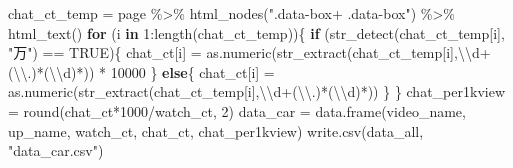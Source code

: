 \documentclass[
]{article}
\newenvironment{Shaded}{\begin{snugshade}}{\end{snugshade}}
\newcommand{\ConstantTok}[1]{\textcolor[rgb]{0.00,0.00,0.00}{#1}}
\newcommand{\ControlFlowTok}[1]{\textcolor[rgb]{0.13,0.29,0.53}{\textbf{#1}}}
\newcommand{\DecValTok}[1]{\textcolor[rgb]{0.00,0.00,0.81}{#1}}
\newcommand{\FunctionTok}[1]{\textcolor[rgb]{0.00,0.00,0.00}{#1}}
\newcommand{\NormalTok}[1]{#1}
\newcommand{\OtherTok}[1]{\textcolor[rgb]{0.56,0.35,0.01}{#1}}
\newcommand{\SpecialCharTok}[1]{\textcolor[rgb]{0.00,0.00,0.00}{#1}}
\newcommand{\StringTok}[1]{\textcolor[rgb]{0.31,0.60,0.02}{#1}}
\begin{document}
\begin{Shaded}
\begin{Highlighting}[]
\NormalTok{chat\_ct\_temp }\OtherTok{=}\NormalTok{ page }\SpecialCharTok{\%\textgreater{}\%} \FunctionTok{html\_nodes}\NormalTok{(}\StringTok{".data{-}box+ .data{-}box"}\NormalTok{) }\SpecialCharTok{\%\textgreater{}\%} \FunctionTok{html\_text}\NormalTok{()}
\ControlFlowTok{for}\NormalTok{ (i }\ControlFlowTok{in} \DecValTok{1}\SpecialCharTok{:}\FunctionTok{length}\NormalTok{(chat\_ct\_temp))\{}
  \ControlFlowTok{if}\NormalTok{ (}\FunctionTok{str\_detect}\NormalTok{(chat\_ct\_temp[i], }\StringTok{"万"}\NormalTok{) }\SpecialCharTok{==} \ConstantTok{TRUE}\NormalTok{)\{}
\NormalTok{    chat\_ct[i] }\OtherTok{=} \FunctionTok{as.numeric}\NormalTok{(}\FunctionTok{str\_extract}\NormalTok{(chat\_ct\_temp[i],}\StringTok{\textquotesingle{}}\SpecialCharTok{\textbackslash{}\textbackslash{}}\StringTok{d+(}\SpecialCharTok{\textbackslash{}\textbackslash{}}\StringTok{.)*(}\SpecialCharTok{\textbackslash{}\textbackslash{}}\StringTok{d)*\textquotesingle{}}\NormalTok{)) }\SpecialCharTok{*} \DecValTok{10000}
\NormalTok{  \}}
  \ControlFlowTok{else}\NormalTok{\{}
\NormalTok{    chat\_ct[i] }\OtherTok{=} \FunctionTok{as.numeric}\NormalTok{(}\FunctionTok{str\_extract}\NormalTok{(chat\_ct\_temp[i],}\StringTok{\textquotesingle{}}\SpecialCharTok{\textbackslash{}\textbackslash{}}\StringTok{d+(}\SpecialCharTok{\textbackslash{}\textbackslash{}}\StringTok{.)*(}\SpecialCharTok{\textbackslash{}\textbackslash{}}\StringTok{d)*\textquotesingle{}}\NormalTok{))}
\NormalTok{  \}}
\NormalTok{\}}
\NormalTok{chat\_per1kview }\OtherTok{=} \FunctionTok{round}\NormalTok{(chat\_ct}\SpecialCharTok{*}\DecValTok{1000}\SpecialCharTok{/}\NormalTok{watch\_ct, }\DecValTok{2}\NormalTok{)}
\NormalTok{data\_car }\OtherTok{=} \FunctionTok{data.frame}\NormalTok{(video\_name, up\_name, watch\_ct, chat\_ct, chat\_per1kview)}
\FunctionTok{write.csv}\NormalTok{(data\_all, }\StringTok{"data\_car.csv"}\NormalTok{)}
\end{Highlighting}
\end{Shaded}
\end{document}
